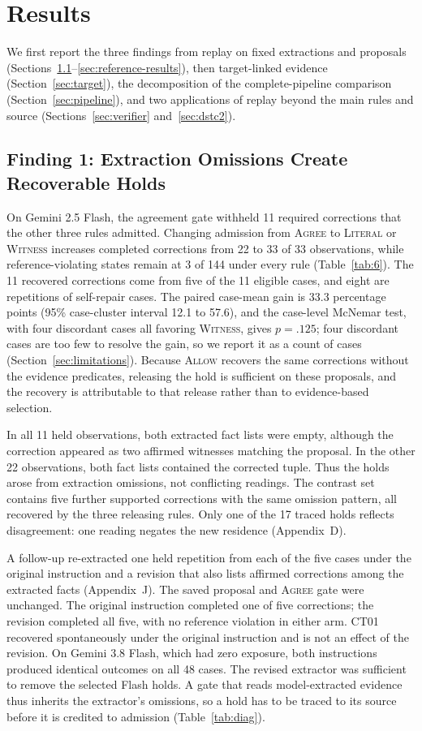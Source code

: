 \documentclass[acmsmall,review,anonymous]{acmart}
\newcommand{\agree}{\textsc{Agree}}
\newcommand{\allow}{\textsc{Allow}}
\newcommand{\literal}{\textsc{Literal}}
\newcommand{\witness}{\textsc{Witness}}
\begin{document}
\section{Results}\label{sec:results}
We first report the three findings from replay on fixed extractions and proposals (Sections~\ref{sec:extraction}--\ref{sec:reference-results}), then target-linked evidence (Section~\ref{sec:target}), the decomposition of the complete-pipeline comparison (Section~\ref{sec:pipeline}), and two applications of replay beyond the main rules and source (Sections~\ref{sec:verifier} and~\ref{sec:dstc2}).

\subsection{Finding 1: Extraction Omissions Create Recoverable Holds}\label{sec:extraction}
On Gemini 2.5 Flash, the agreement gate withheld 11 required corrections that the other three rules admitted. Changing admission from \agree{} to \literal{} or \witness{} increases completed corrections from 22 to 33 of 33 observations, while reference-violating states remain at 3 of 144 under every rule (Table~\ref{tab:6}). The 11 recovered corrections come from five of the 11 eligible cases, and eight are repetitions of self-repair cases. The paired case-mean gain is 33.3 percentage points (95\% case-cluster interval 12.1 to 57.6), and the case-level McNemar test, with four discordant cases all favoring \witness{}, gives $p=.125$; four discordant cases are too few to resolve the gain, so we report it as a count of cases (Section~\ref{sec:limitations}). Because \allow{} recovers the same corrections without the evidence predicates, releasing the hold is sufficient on these proposals, and the recovery is attributable to that release rather than to evidence-based selection.

In all 11 held observations, both extracted fact lists were empty, although the correction appeared as two affirmed witnesses matching the proposal. In the other 22 observations, both fact lists contained the corrected tuple. Thus the holds arose from extraction omissions, not conflicting readings. The contrast set contains five further supported corrections with the same omission pattern, all recovered by the three releasing rules. Only one of the 17 traced holds reflects disagreement: one reading negates the new residence (Appendix~D).

A follow-up re-extracted one held repetition from each of the five cases under the original instruction and a revision that also lists affirmed corrections among the extracted facts (Appendix~J). The saved proposal and \agree{} gate were unchanged. The original instruction completed one of five corrections; the revision completed all five, with no reference violation in either arm. CT01 recovered spontaneously under the original instruction and is not an effect of the revision. On Gemini 3.8 Flash, which had zero exposure, both instructions produced identical outcomes on all 48 cases. The revised extractor was sufficient to remove the selected Flash holds. A gate that reads model-extracted evidence thus inherits the extractor's omissions, so a hold has to be traced to its source before it is credited to admission (Table~\ref{tab:diag}).
\end{document}
